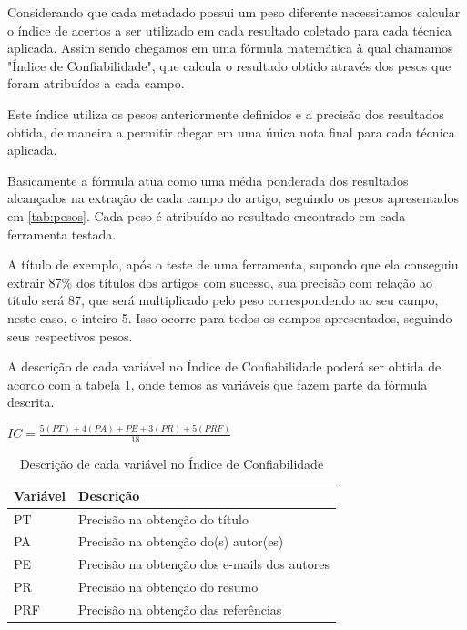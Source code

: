 
Considerando que cada metadado possui um peso diferente necessitamos calcular o índice de acertos a ser utilizado em cada resultado coletado para cada técnica aplicada. Assim sendo chegamos em uma fórmula matemática à qual chamamos "Índice de Confiabilidade", que calcula o resultado obtido através dos pesos que foram atribuídos a cada campo.

Este índice utiliza os pesos anteriormente definidos e a precisão dos resultados obtida, de maneira a permitir chegar em uma única nota final para cada técnica aplicada.

Basicamente a fórmula atua como uma média ponderada dos resultados alcançados na extração de cada campo do artigo, seguindo os pesos apresentados em \ref{tab:pesos}. Cada peso é atribuído ao resultado encontrado em cada ferramenta testada. 

A título de exemplo, após o teste de uma ferramenta, supondo que ela conseguiu extrair 87\% dos títulos dos artigos com sucesso, sua precisão com relação ao título será 87, que será multiplicado pelo peso correspondendo ao seu campo, neste caso, o inteiro 5. Isso ocorre para todos os campos apresentados, seguindo seus respectivos pesos.

A descrição de cada variável no Índice de Confiabilidade poderá ser obtida de acordo com a tabela \ref{tab:indice-confidencialidade}, onde temos as variáveis que fazem parte da fórmula descrita.

\begin{center}
	$ IC=\frac{5(PT)+4(PA)+PE+3(PR)+5(PRF)}{18} $
\end{center}

\begin{table}
    \caption{Descrição de cada variável no Índice de Confiabilidade}
    \begin{center}
    	\begin{tabular}{|p{3cm}|p{8cm}|}
			\hline \textbf{Variável} & \textbf{Descrição}\\ 
			\hline PT & Precisão na obtenção do título \\
			\hline PA & Precisão na obtenção do(s) autor(es)\\
			\hline PE & Precisão na obtenção dos e-mails dos autores \\
			\hline PR & Precisão na obtenção do resumo \\
			\hline PRF & Precisão na obtenção das referências \\
	    	\hline 
    	\end{tabular} 
    \end{center}
  	\label{tab:indice-confidencialidade}
\end{table}